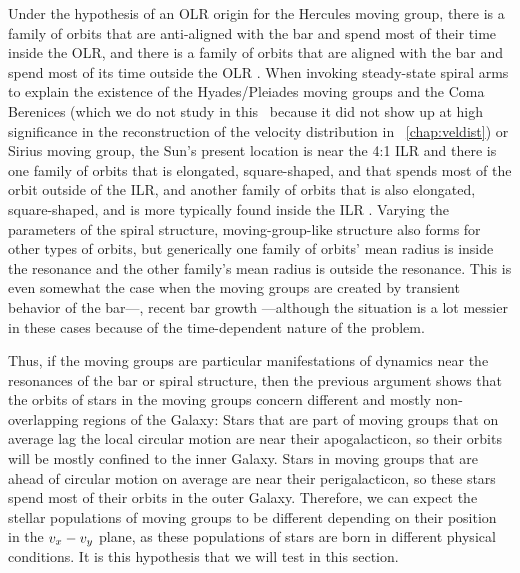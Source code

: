 Under the hypothesis of an OLR origin for the Hercules moving group,
there is a family of orbits that are anti-aligned with the bar and
spend most of their time inside the OLR, and there is a family of
orbits that are aligned with the bar and spend most of its time
outside the OLR \citep{Contopoulos89a}. When invoking steady-state
spiral arms to explain the existence of the Hyades/Pleiades moving
groups and the Coma Berenices (which we do not study in
this \chaptername\ because it did not show up at high significance in
the reconstruction of the velocity distribution
in \chaptername~\ref{chap:veldist}) or Sirius moving group, the Sun's
present location is near the 4:1 ILR and there is one family of orbits
that is elongated, square-shaped, and that spends most of the orbit
outside of the ILR, and another family of orbits that is also
elongated, square-shaped, and is more typically found inside the ILR
\citep{Contopoulos86a}. Varying the parameters of the spiral
structure, moving-group-like structure also forms for other types of
orbits, but generically one family of orbits' mean radius is inside
the resonance and the other family's mean radius is outside the
resonance. This is even somewhat the case when the moving groups are
created by transient behavior of the bar---\eg, recent bar growth
\citep{Minchev09a}---although the situation is a lot messier in these
cases because of the time-dependent nature of the problem.


Thus, if the moving groups are particular manifestations of dynamics
near the resonances of the bar or spiral structure, then the previous
argument shows that the orbits of stars in the moving groups concern
different and mostly non-overlapping regions of the Galaxy: Stars that
are part of moving groups that on average lag the local circular
motion are near their apogalacticon, so their orbits will be mostly
confined to the inner Galaxy. Stars in moving groups that are ahead of
circular motion on average are near their perigalacticon, so these
stars spend most of their orbits in the outer Galaxy. Therefore, we
can expect the stellar populations of moving groups to be different
depending on their position in the $v_x-v_y$ plane, as these
populations of stars are born in different physical conditions. It is
this hypothesis that we will test in this section.


